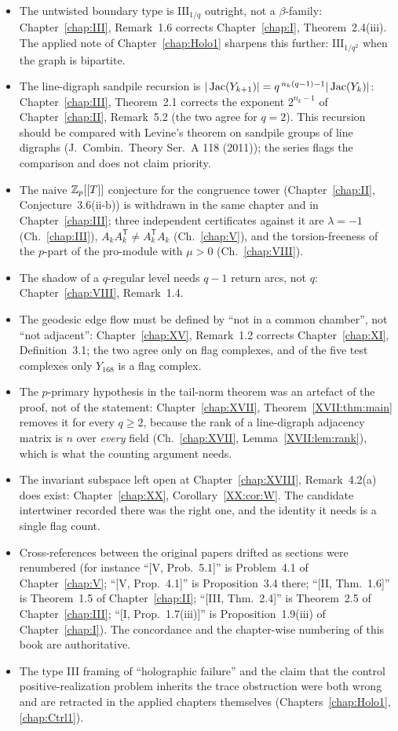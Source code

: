\begin{itemize}
\item The untwisted boundary type is $\mathrm{III}_{1/q}$ outright, not a
$\beta$-family: Chapter~\ref{chap:III}, Remark~1.6 corrects Chapter~\ref{chap:I},
Theorem~2.4(iii). The applied note of Chapter~\ref{chap:Holo1} sharpens this further:
$\mathrm{III}_{1/q^2}$ when the graph is bipartite.
\item The line-digraph sandpile recursion is $|\operatorname{Jac}(Y_{k+1})|=q^{\,n_k(q-1)-1}|\operatorname{Jac}(Y_k)|$:
Chapter~\ref{chap:III}, Theorem~2.1 corrects the exponent $2^{n_k-1}$ of
Chapter~\ref{chap:II}, Remark~5.2 (the two agree for $q=2$). This recursion should be
compared with Levine's theorem on sandpile groups of line digraphs (J.\ Combin.\ Theory
Ser.\ A 118 (2011)); the series flags the comparison and does not claim priority.
\item The naive $\mathbb{Z}_p[[T]]$ conjecture for the congruence tower
(Chapter~\ref{chap:II}, Conjecture~3.6(ii-b)) is withdrawn in the same chapter and in
Chapter~\ref{chap:III}; three independent certificates against it are $\lambda=-1$
(Ch.~\ref{chap:III}), $A_kA_k^{\mathsf T}\ne A_k^{\mathsf T}A_k$ (Ch.~\ref{chap:V}), and
the torsion-freeness of the $p$-part of the pro-module with $\mu>0$
(Ch.~\ref{chap:VIII}).
\item The shadow of a $q$-regular level needs $q-1$ return arcs, not $q$:
Chapter~\ref{chap:VIII}, Remark~1.4.
\item The geodesic edge flow must be defined by ``not in a common chamber'', not ``not
adjacent'': Chapter~\ref{chap:XV}, Remark~1.2 corrects Chapter~\ref{chap:XI},
Definition~3.1; the two agree only on flag complexes, and of the five test complexes
only $Y_{168}$ is a flag complex.
\item The $p$-primary hypothesis in the tail-norm theorem was an artefact of the proof, not
of the statement: Chapter~\ref{chap:XVII}, Theorem~\ref{XVII:thm:main} removes it for every
$q\ge2$, because the rank of a line-digraph adjacency matrix is $n$ over \emph{every} field
(Ch.~\ref{chap:XVII}, Lemma~\ref{XVII:lem:rank}), which is what the counting argument needs.
\item The invariant subspace left open at Chapter~\ref{chap:XVIII}, Remark~4.2(a) does
exist: Chapter~\ref{chap:XX}, Corollary~\ref{XX:cor:W}. The candidate intertwiner recorded
there was the right one, and the identity it needs is a single flag count.
\item Cross-references between the original papers drifted as sections were
renumbered (for instance ``[V, Prob.~5.1]'' is Problem~4.1 of Chapter~\ref{chap:V};
``[V, Prop.~4.1]'' is Proposition~3.4 there; ``[II, Thm.~1.6]'' is Theorem~1.5 of
Chapter~\ref{chap:II}; ``[III, Thm.~2.4]'' is Theorem~2.5 of Chapter~\ref{chap:III};
``[I, Prop.~1.7(iii)]'' is Proposition~1.9(iii) of Chapter~\ref{chap:I}). The
concordance and the chapter-wise numbering of this book are authoritative.
\item The type III framing of ``holographic failure'' and the claim that the control
positive-realization problem inherits the trace obstruction were both wrong and are
retracted in the applied chapters themselves (Chapters~\ref{chap:Holo1},
\ref{chap:Ctrl1}).
\end{itemize}

